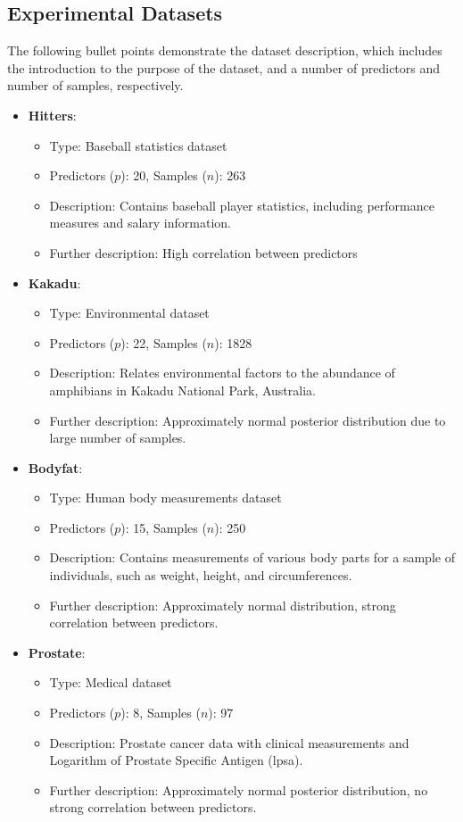 \subsection{Experimental Datasets}
The following bullet points demonstrate the dataset description, which includes the introduction to the purpose of the dataset, and a number of predictors and number of samples, respectively.
\begin{itemize}
	
	\item \textbf{Hitters}:
	\begin{itemize}
		\item Type: Baseball statistics dataset
		\item Predictors ($p$): 20, Samples ($n$): 263
		\item Description: Contains baseball player statistics, including performance measures and salary information.
		\item Further description: High correlation between predictors
	\end{itemize}
	
	\item \textbf{Kakadu}:
	\begin{itemize}
		\item Type: Environmental dataset
		\item Predictors ($p$): 22, Samples ($n$): 1828
		\item Description: Relates environmental factors to the abundance of amphibians in Kakadu National Park, Australia.
		\item Further description: Approximately normal posterior distribution due to large number of samples.
	\end{itemize}
	
	\item \textbf{Bodyfat}:
	\begin{itemize}
		\item Type: Human body measurements dataset
		\item Predictors ($p$): 15, Samples ($n$): 250
		\item Description: Contains measurements of various body parts for a sample of individuals, such as weight, height, and circumferences.
		\item Further description: Approximately normal distribution,   strong correlation between predictors.
	\end{itemize}
	\item \textbf{Prostate}:
	\begin{itemize}
		\item Type: Medical dataset
		\item Predictors ($p$): 8, Samples ($n$): 97
		\item Description: Prostate cancer data with clinical measurements and Logarithm of Prostate Specific Antigen (lpsa).
		\item Further description: Approximately normal posterior distribution, no strong correlation between predictors.
	\end{itemize}
	

\end{itemize}
